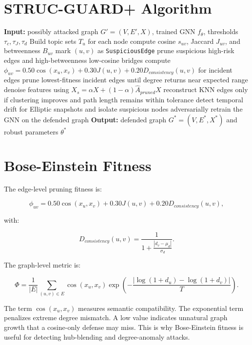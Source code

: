\documentclass[12pt,oneside]{report}
\begin{document}
\section{STRUC-GUARD+ Algorithm}
\begin{algorithm}[H]
\caption{STRUC-GUARD+ with Ontology-Driven Self-Healing}
\begin{algorithmic}[1]
\STATE \textbf{Input:} possibly attacked graph $G'=(V,E',X)$, trained GNN $f_\theta$, thresholds $\tau_c,\tau_J,\tau_d$
\STATE Build topic sets $T_u$ for each node
\STATE compute cosine $s_{uv}$, Jaccard $J_{uv}$, and betweenness $B_{uv}$
\STATE mark $(u,v)$ as \texttt{SuspiciousEdge}
\ENDIF
\ENDFOR
\STATE prune suspicious high-risk edges and high-betweenness low-cosine bridges
\STATE compute $\phi_{uv}=0.50\cos(x_u,x_v)+0.30J(u,v)+0.20D_{consistency}(u,v)$ for incident edges
\STATE prune lowest-fitness incident edges until degree returns near expected range
\ENDFOR
\STATE denoise features using $X_s=\alpha X+(1-\alpha)\hat{A}_{pruned}X$
\STATE reconstruct KNN edges only if clustering improves and path length remains within tolerance
\STATE detect temporal drift for Elliptic snapshots and isolate suspicious nodes
\STATE adversarially retrain the GNN on the defended graph
\STATE \textbf{Output:} defended graph $G^*=(V,E^*,X^*)$ and robust parameters $\theta^*$
\end{algorithmic}
\end{algorithm}

\section{Bose-Einstein Fitness}
The edge-level pruning fitness is:

$$
\phi_{uv}=0.50\cos(x_u,x_v)+0.30J(u,v)+0.20D_{consistency}(u,v),
$$

with:

$$
D_{consistency}(u,v)=\frac{1}{1+\frac{|d_v-\mu_d|}{\sigma_d}}.
$$

The graph-level metric is:

$$
\Phi=\frac{1}{|E|}\sum_{(u,v)\in E}\cos(x_u,x_v)\exp\left(-\frac{|\log(1+d_u)-\log(1+d_v)|}{T}\right).
$$

The term $\cos(x_u,x_v)$ measures semantic compatibility. The exponential term penalizes extreme degree mismatch. A low value indicates unnatural graph growth that a cosine-only defense may miss. This is why Bose-Einstein fitness is useful for detecting hub-blending and degree-anomaly attacks.
\end{document}
